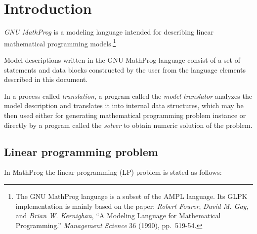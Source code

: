 \documentclass[11pt]{report}
\begin{document}

\newpage

{\setlength{\parskip}{0pt}
\tableofcontents
}


\chapter{Introduction}

{\it GNU MathProg} is a modeling language intended for describing
linear mathematical programming models.\footnote{The GNU MathProg
language is a subset of the AMPL language. Its GLPK implementation is
mainly based on the paper: {\it Robert Fourer}, {\it David M. Gay}, and
{\it Brian W. Kernighan}, ``A Modeling Language for Mathematical
Programming.'' {\it Management Science} 36 (1990), pp.~519-54.}

Model descriptions written in the GNU MathProg language consist of
a set of statements and data blocks constructed by the user from the
language elements described in this document.

In a process called {\it translation}, a program called the {\it model
translator} analyzes the model description and translates it into
internal data structures, which may be then used either for generating
mathematical programming problem instance or directly by a program
called the {\it solver} to obtain numeric solution of the problem.

\section{Linear programming problem}
\label{problem}

In MathProg the linear programming (LP) problem is stated as follows:

\medskip
\end{document}
